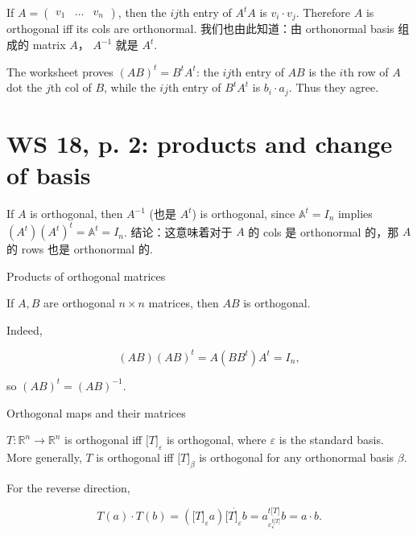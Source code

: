 If \(A = \begin{pmatrix}
v_{1} & \ldots & v_{n}
\end{pmatrix}\), then the \(ij\)th entry of \(A^{t}A\) is \(v_{i} \cdot v_{j}\). Therefore \(A\) is orthogonal iff its cols are orthonormal. 我们也由此知道：由 orthonormal basis 组成的 matrix \(A\)， \(A^{- 1}\) 就是 \(A^{t}\).

The worksheet proves \(\left( {AB} \right)^{t} = B^{t}A^{t}\): the \(ij\)th entry of \(AB\) is the \(i\)th row of \(A\) dot the \(j\)th col of \(B\), while the \(ij\)th entry of \(B^{t}A^{t}\) is \(b_{i} \cdot a_{j}\). Thus they agree.

\section{WS 18, p. 2: products and change of basis}

If \(A\) is orthogonal, then \(A^{- 1}\) (也是 \(A^{t}\)) is orthogonal, since \(\mathbb{A}^{t} = I_{n}\) implies \(\left( A^{t} \right)\left( A^{t} \right)^{t} = \mathbb{A}^{t} = I_{n}\). 结论：这意味着对于 \(A\) 的 cols 是 orthonormal 的，那 \(A\) 的 rows 也是 orthonormal 的.

\begin{theorem}{Products of orthogonal matrices}

If \(A,B\) are orthogonal \(n \times n\) matrices, then \(AB\) is orthogonal.

\end{theorem}

Indeed,

\[\left( {AB} \right)\left( {AB} \right)^{t} = A\left( {BB^{t}} \right)A^{t} = I_{n},\]

so \(\left( {AB} \right)^{t} = \left( {AB} \right)^{- 1}\).

\begin{theorem}{Orthogonal maps and their matrices}

\(T:\mathbb{R}^{n}\rightarrow\mathbb{R}^{n}\) is orthogonal iff \(\lbrack T\rbrack_{\varepsilon}\) is orthogonal, where \(\varepsilon\) is the standard basis. More generally, \(T\) is orthogonal iff \(\lbrack T\rbrack_{\beta}\) is orthogonal for any orthonormal basis \(\beta\).

\end{theorem}

For the reverse direction,

\[T(a) \cdot T(b) = \left( {\lbrack T\rbrack_{\varepsilon}a} \right)\dot{\lbrack T\rbrack_{\varepsilon}b} = a_{\varepsilon_{\varepsilon}^{t{\lbrack T\rbrack}}}^{t{\lbrack T\rbrack}}b = a \cdot b.\]

